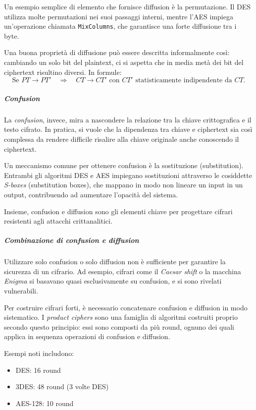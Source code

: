 \documentclass{report}
\begin{document}
Un esempio semplice di elemento che fornisce diffusion è la permutazione. Il DES utilizza molte permutazioni nei suoi passaggi interni, mentre l’AES impiega un’operazione chiamata \texttt{MixColumns}, che garantisce una forte diffusione tra i byte.

Una buona proprietà di diffusione può essere descritta informalmente così: cambiando un solo bit del plaintext, ci si aspetta che in media metà dei bit del ciphertext risultino diversi. In formule:
\[
\text{Se } PT \rightarrow PT' \quad \Rightarrow \quad CT \rightarrow CT' \text{ con } CT' \text{ statisticamente indipendente da } CT.
\]

\subparagraph{Confusion}

La \textit{confusion}, invece, mira a nascondere la relazione tra la chiave crittografica e il testo cifrato. In pratica, si vuole che la dipendenza tra chiave e ciphertext sia così complessa da rendere difficile risalire alla chiave originale anche conoscendo il ciphertext.

Un meccanismo comune per ottenere confusion è la sostituzione (substitution). Entrambi gli algoritmi DES e AES impiegano sostituzioni attraverso le cosiddette \textit{S-boxes} (substitution boxes), che mappano in modo non lineare un input in un output, contribuendo ad aumentare l'opacità del sistema.

Insieme, confusion e diffusion sono gli elementi chiave per progettare cifrari resistenti agli attacchi crittanalitici.

\subparagraph{Combinazione di confusion e diffusion}

Utilizzare solo confusion o solo diffusion non è sufficiente per garantire la sicurezza di un cifrario. Ad esempio, cifrari come il \textit{Caesar shift} o la macchina \textit{Enigma} si basavano quasi esclusivamente su confusion, e si sono rivelati vulnerabili.

Per costruire cifrari forti, è necessario concatenare confusion e diffusion in modo sistematico. I \textit{product ciphers} sono una famiglia di algoritmi costruiti proprio secondo questo principio: essi sono composti da più round, ognuno dei quali applica in sequenza operazioni di confusion e diffusion.

Esempi noti includono:
\begin{itemize}
  \item DES: 16 round
  \item 3DES: 48 round (3 volte DES)
  \item AES-128: 10 round
\end{itemize}
\end{document}
